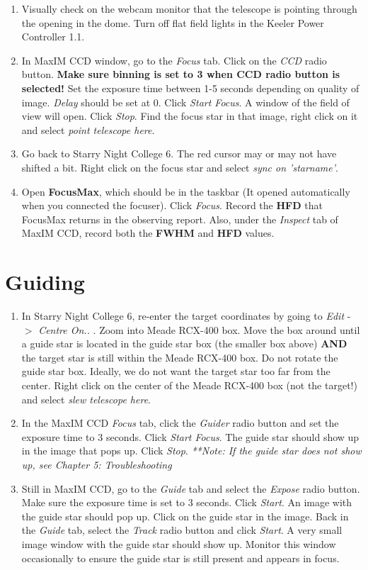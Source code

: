 \documentclass[11pt]{report}
\begin{document}
\begin{enumerate}
\item Visually check on the webcam monitor that the telescope is pointing through the opening in the dome. Turn off flat field lights in the Keeler Power Controller 1.1.
\item In MaxIM CCD window, go to the \emph{Focus} tab. Click on the \emph{CCD} radio button. {\bf Make sure binning is set to 3 when CCD radio button is selected!} Set the exposure time between 1-5 seconds depending on quality of image. \emph{Delay} should be set at 0. Click \emph{Start Focus}. A window of the field of view will open. Click \emph{Stop}. Find the focus star in that image, right click on it and select \emph{point telescope here}.
\item Go back to Starry Night College 6.  The red cursor may or may not have shifted a bit. Right click on the focus star and select \emph{sync on 'starname'}. 
\item Open {\bf FocusMax}, which should be in the taskbar (It opened automatically when you connected the focuser). Click \emph{Focus}. Record the {\bf HFD} that FocusMax returns in the observing report. Also, under the \emph{Inspect} tab of MaxIM CCD, record both the {\bf FWHM} and {\bf HFD} values. 
\end{enumerate}

\section{Guiding}

\begin{enumerate}
\item In Starry Night College 6, re-enter the target coordinates by going to \emph{Edit} -{$>$} \emph{Centre On..} . Zoom into Meade RCX-400 box. Move the box around until a guide star is located in the guide star box (the smaller box above)  {\bf AND} the target star is still within the Meade RCX-400 box. Do not rotate the guide star box. Ideally, we do not want the target star too far from the center. Right click on the center of the Meade RCX-400 box (not the target!) and select \emph{slew telescope here}.
\item In the MaxIM CCD \emph{Focus} tab, click the \emph{Guider} radio button and set the exposure time to 3 seconds. Click \emph{Start Focus}. The guide star should show up in the image that pops up. Click \emph{Stop}. \emph{**Note: If the guide star does not show up, see Chapter 5: Troubleshooting}
\item Still in MaxIM CCD, go to the \emph{Guide} tab and select the \emph{Expose} radio button. Make sure the exposure time is set to 3 seconds. Click \emph{Start}. An image with the guide star should pop up. Click on the guide star in the image. Back in the \emph{Guide} tab, select the \emph{Track} radio button and click \emph{Start}. A very small image window with the guide star should show up. Monitor this window occasionally to ensure the guide star is still present and appears in focus. 
\end{enumerate}
\end{document}
